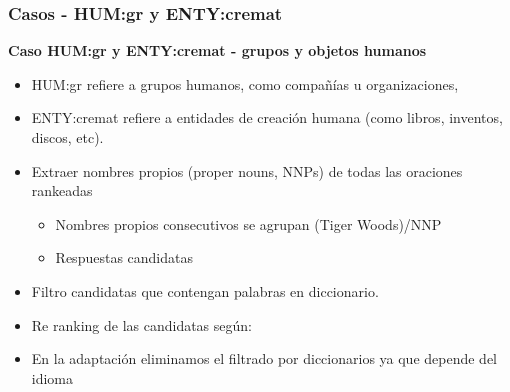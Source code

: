 \begin{frame}
\frametitle{Casos - HUM:gr y ENTY:cremat}
\textbf{Caso HUM:gr y ENTY:cremat - grupos y objetos humanos} \newline
  \begin{itemize}
    \item HUM:gr refiere a grupos humanos, como compañías u organizaciones, 
    \item ENTY:cremat refiere a entidades de creación humana (como libros, inventos, discos, etc).
    \item Extraer nombres propios (proper nouns, NNPs) de todas las oraciones rankeadas 
    \begin{itemize}
        \item Nombres propios consecutivos se agrupan (Tiger Woods)/NNP 
        \item Respuestas candidatas
    \end{itemize}
    \item Filtro candidatas que contengan palabras en diccionario. \footnotemark
    \item Re ranking de las candidatas según: 
    \item En la adaptación eliminamos el filtrado por diccionarios ya que depende del idioma
  \end{itemize}

\end{frame}

